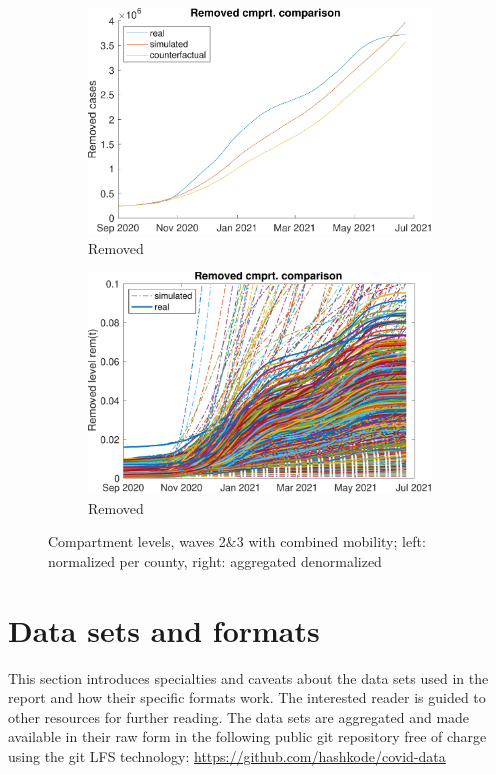 \begin{figure}[hbtp]
\begin{subfigure}[b]{.45\linewidth}
         \centering
         \includegraphics[width=\linewidth]{img/210907_224622_combined_wave23/figures/COMP_rem}
         \caption{Removed}
         \label{fig:compAggrCombWave23Rem}
     \end{subfigure}
     \hfill
     \begin{subfigure}[b]{.45\linewidth}
         \centering
         \includegraphics[width=\linewidth]{img/210907_224622_combined_wave23/figures/SEIR_r_sim-vs-real}
         \caption{Removed}
         \label{fig:compCombWave23Rem}
     \end{subfigure}     
     \caption{Compartment levels, waves 2\&3 with combined mobility; left: normalized per county, right: aggregated denormalized}
     \label{fig:compCombWave23}
\end{figure}

\section{Data sets and formats}
This section introduces specialties and caveats about the data sets used in the report and how their specific formats work. The interested reader is guided to other resources for further reading. The data sets are aggregated and made available in their raw form in the following public git repository free of charge using the git LFS technology: \url{https://github.com/hashkode/covid-data}

